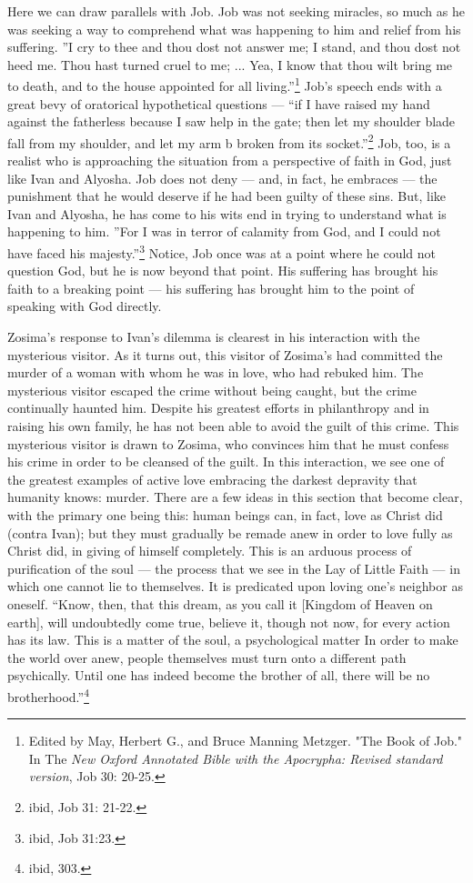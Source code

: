 Here we can draw parallels with Job. Job was not seeking miracles, so much as he was seeking a way to comprehend what was happening to him and relief from his suffering. ''I cry to thee and thou dost not answer me; I stand, and thou dost not heed me. Thou hast turned cruel to me; ... Yea, I know that thou wilt bring me to death, and to the house appointed for all living.''\footnote{Edited by May, Herbert G., and Bruce Manning Metzger. "The Book of Job." In The \emph{New Oxford Annotated Bible with the Apocrypha: Revised standard version}, Job 30: 20-25.} Job's speech ends with a great bevy of oratorical hypothetical questions --- ``if I have raised my hand against the fatherless because I saw help in the gate; then let my shoulder blade fall from my shoulder, and let my arm b broken from its socket.''\footnote{ibid, Job 31: 21-22.} Job, too, is a realist who is approaching the situation from a perspective of faith in God, just like Ivan and Alyosha. Job does not deny --- and, in fact, he embraces --- the punishment that he would deserve if he had been guilty of these sins. But, like Ivan and Alyosha, he has come to his wits end in trying to understand what is happening to him. ''For I was in terror of calamity from God, and I could not have faced his majesty.''\footnote{ibid, Job 31:23.} Notice, Job once was at a point where he could not question God, but he is now beyond that point. His suffering has brought his faith to a breaking point --- his suffering has brought him to the point of speaking with God directly. 

Zosima's response to Ivan's dilemma is clearest in his interaction with the mysterious visitor. As it turns out, this visitor of Zosima's had committed the murder of a woman with whom he was in love, who had rebuked him. The mysterious visitor escaped the crime without being caught, but the crime continually haunted him. Despite his greatest efforts in philanthropy and in raising his own family, he has not been able to avoid the guilt of this crime. This mysterious visitor is drawn to Zosima, who convinces him that he must confess his crime in order to be cleansed of the guilt. In this interaction, we see one of the greatest examples of active love embracing the darkest depravity that humanity knows: murder. There are a few ideas in this section that become clear, with the primary one being this: human beings can, in fact, love as Christ did (contra Ivan); but they must gradually be remade anew in order to love fully as Christ did, in giving of himself completely. This is an arduous process of purification of the soul --- the process that we see in the Lay of Little Faith --- in which one cannot lie to themselves. It is predicated upon loving one's neighbor as oneself. ``Know, then, that this dream, as you call it [Kingdom of Heaven on earth], will undoubtedly come true, believe it, though not now, for every action has its law. This is a matter of the soul, a psychological matter In order to make the world over anew, people themselves must turn onto a different path psychically. Until one has indeed become the brother of all, there will be no brotherhood.''\footnote{ibid, 303.}

